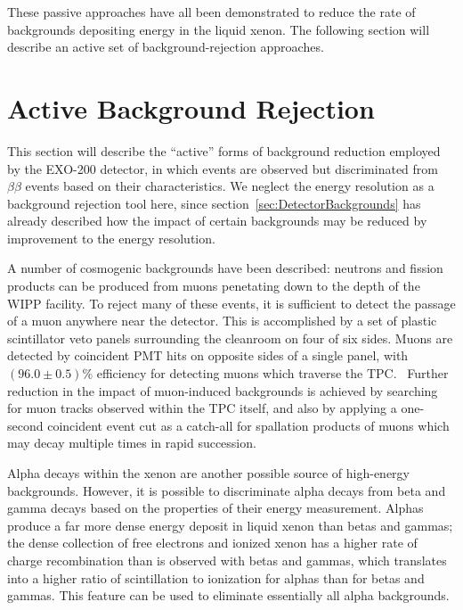These passive approaches have all been demonstrated to reduce the rate of backgrounds depositing energy in the liquid xenon.  The following section will describe an active set of background-rejection approaches.

\section{Active Background Rejection}\label{sec:DetectorActiveBackgroundRejection}

This section will describe the ``active'' forms of background reduction employed by the EXO-200 detector, in which events are observed but discriminated from $\beta\beta$ events based on their characteristics.  We neglect the energy resolution as a background rejection tool here, since section~\ref{sec:DetectorBackgrounds} has already described how the impact of certain backgrounds may be reduced by improvement to the energy resolution.

A number of cosmogenic backgrounds have been described: neutrons and fission products can be produced from muons penetating down to the depth of the WIPP facility.  To reject many of these events, it is sufficient to detect the passage of a muon anywhere near the detector.  This is accomplished by a set of plastic scintillator veto panels surrounding the cleanroom on four of six sides.  Muons are detected by coincident PMT hits on opposite sides of a single panel, with $(96.0 \pm 0.5)\%$ efficiency for detecting muons which traverse the TPC.~\cite{detectorPartI}  Further reduction in the impact of muon-induced backgrounds is achieved by searching for muon tracks observed within the TPC itself, and also by applying a one-second coincident event cut as a catch-all for spallation products of muons which may decay multiple times in rapid succession.

Alpha decays within the xenon are another possible source of high-energy backgrounds.  However, it is possible to discriminate alpha decays from beta and gamma decays based on the properties of their energy measurement.  Alphas produce a far more dense energy deposit in liquid xenon than betas and gammas; the dense collection of free electrons and ionized xenon has a higher rate of charge recombination than is observed with betas and gammas, which translates into a higher ratio of scintillation to ionization for alphas than for betas and gammas.  This feature can be used to eliminate essentially all alpha backgrounds.

